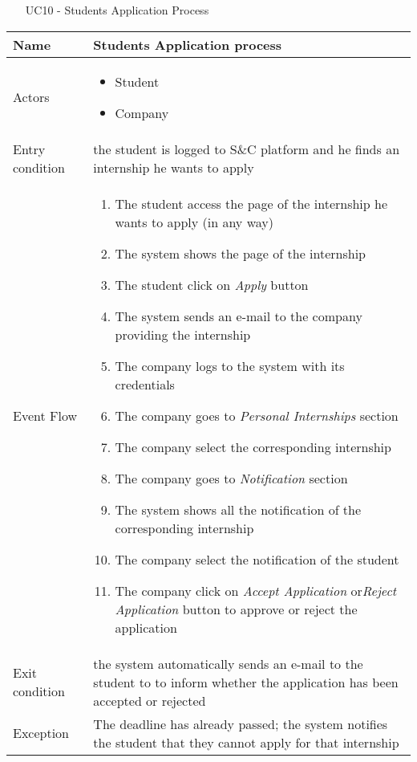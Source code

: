 				
				\begin{table} [H]
					\centering
						\begin{itemize}
						\item [UC10] - Students Application Process
					\end{itemize}
					\begin{tabular}{|| P{7.5cm} | P{7.5cm} ||}
						\hline
						Name & Students Application process \\
						\hline
						Actors & \parbox{5cm}{\begin{itemize}
								\item Student
								\item Company
							\end{itemize}
						} \\
						\hline
						Entry condition & the student is logged to S\&C platform and he finds an internship he wants to apply \\
						\hline
						Event Flow & \parbox{5cm}{\begin{enumerate}
								\item The student access the page of the 
								internship he wants to apply (in any way) 
								\item The system shows the page of the 
								internship 
								\item The student click on \textit{Apply} button
								\item  The system sends an e-mail to the 
								company providing the internship
								\item The company logs to the system with 
								its credentials
								\item The company goes to \textit{Personal 
								Internships} section
								\item The company select the 
								corresponding internship
								\item The company goes to \textit{Notification} 
								section 
								\item The system shows all the notification 
								of the corresponding internship
								\item The company select the notification 
								of the student 
								\item The company click on \textit{Accept 
								Application} or\textit{Reject Application}
								button to approve or reject the 
								application
						\end{enumerate}} \\
						\hline 
						Exit condition & the system automatically sends an e-mail to 
						the student to to inform whether the 
						application has been accepted or rejected  \\
						\hline
						Exception & The deadline has already passed; the system notifies the student that they cannot apply for that internship \\
						\hline
					\end{tabular}
				\end{table}
				
